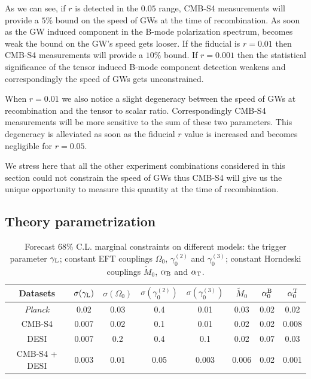 As we can see, if $r$ is detected in the $0.05$ range, CMB-S4 measurements will provide a $5\%$ bound on the speed of GWs at the time of recombination.
As soon as the GW induced component in the B-mode polarization spectrum, becomes weak the bound on the GW's speed gets looser. If the fiducial is $r=0.01$ then CMB-S4 measurements will provide a $10\%$ bound. If $r=0.001$ then the statistical significance of the tensor induced B-mode component detection weakens and correspondingly the speed of GWs gets unconstrained.

When $r=0.01$ we also notice a slight degeneracy between the speed of GWs at recombination and the tensor to scalar ratio. Correspondingly CMB-S4 measurements will be more sensitive to the sum of these two parameters. This degeneracy is alleviated as soon as the fiducial $r$ value is increased and becomes negligible for $r=0.05$.

We stress here that all the other experiment combinations considered in this section could not constrain the speed of GWs thus CMB-S4 will give us the unique opportunity to measure this quantity at the time of recombination.

\subsection{Theory parametrization}

\begin{table}[t!]
\begin{center}
\begin{tabular}{|c||c||c|c|c||c|c|c|} 
\hline
Datasets 			& $\sigma ( \gamma_{\rm L} )$  & $\sigma ( \Omega_0 )$ & $\sigma ( \gamma_0^{(2)} )$ & $\sigma ( \gamma_0^{(3)} ) $ & $\tilde{M}_0$ & $\alpha_0^{\rm B}$ & $\alpha_0^{\rm T}$    \\
\hline
\hline
{\it Planck}  		& 0.02 & 0.03 & 0.4 & 0.01 & 0.03 & 0.02 & 0.02 \\
\hline
CMB-S4       & 0.007 & 0.02 & 0.1 & 0.01 & 0.02 & 0.02 & 0.008 \\
\hline
DESI            & 0.007 & 0.2 & 0.4 & 0.1 & 0.02 & 0.07 & 0.03 \\
\hline
CMB-S4 + DESI  & 0.003 & 0.01 & 0.05 & 0.003 & 0.006 & 0.02 & 0.001 \\
\hline
\end{tabular}
\caption{Forecast $68\%$ C.L. marginal constraints on different models: the trigger parameter $\gamma_{\rm L}$; constant EFT couplings $\Omega_0$, $\gamma_0^{(2)}$ and $\gamma_0^{(3)}$; constant Horndeski couplings $\tilde{M}_0$, $\alpha_{\rm B}$ and $\alpha_{\rm T}$.}
\label{table:ForecastGammaConstEFT}
\end{center}
\end{table}

